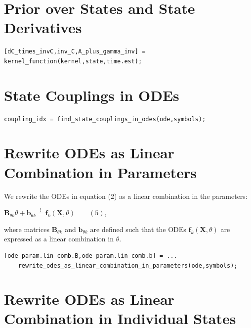 \section{Prior over States and State Derivatives}
\color{RoyalPurple}\begin{verbatim}
[dC_times_invC,inv_C,A_plus_gamma_inv] = kernel_function(kernel,state,time.est);
\end{verbatim}
\color{black}


\section{State Couplings in ODEs}

\color{RoyalPurple}\begin{verbatim}
coupling_idx = find_state_couplings_in_odes(ode,symbols);
\end{verbatim}
\color{black}


\section{Rewrite ODEs as Linear Combination in Parameters}

\begin{par}
We rewrite the ODEs in equation (2) as a linear combination in the parameters:
\end{par} \vspace{1em}
\begin{par}
$\mathbf{B}_{\theta k} \theta + \mathbf{b}_{\theta k} \stackrel{!}{=} \mathbf{f}_k(\mathbf{X},\theta) \qquad (5)$,
\end{par} \vspace{1em}
\begin{par}
where matrices $\mathbf{B}_{\theta k}$ and $\mathbf{b}_{\theta k}$ are defined such that the ODEs $\mathbf{f}_k(\mathbf{X},\theta)$ are expressed as a linear combination in $\theta$.
\end{par} \vspace{1em}
\color{RoyalPurple}\begin{verbatim}
[ode_param.lin_comb.B,ode_param.lin_comb.b] = ...
    rewrite_odes_as_linear_combination_in_parameters(ode,symbols);
\end{verbatim}
\color{black}

\section{Rewrite ODEs as Linear Combination in Individual States}

